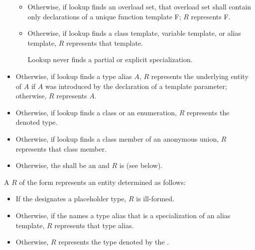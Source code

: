 \begin{itemize}
\begin{itemize}
\item
Otherwise, if lookup finds an overload set,
that overload set shall contain only
declarations of a unique function template F;
$R$ represents F.
\item
Otherwise, if lookup finds
a class template, variable template, or alias template,
$R$ represents that template.
\begin{note}
Lookup never finds a partial or explicit specialization.
\end{note}
\end{itemize}
\item
Otherwise, if lookup finds a type alias $A$,
$R$ represents the underlying entity of $A$
if $A$ was introduced by the declaration of a template parameter;
otherwise, $R$ represents $A$.
\item
Otherwise, if lookup finds a class or an enumeration,
$R$ represents the denoted type.
\item
Otherwise, if lookup finds a class member of an anonymous union, $R$ represents that class member.
\item
Otherwise,
the  shall be an  
and $R$ is  (see below).
\end{itemize}

\pnum
A  $R$ of the form
represents an entity determined as follows:
\begin{itemize}
\item
If the  designates
a placeholder type,
$R$ is ill-formed.
\item
Otherwise, if the  names a type alias
that is a specialization of an alias template,
$R$ represents that type alias.
\item
Otherwise, $R$ represents the type denoted by the .
\end{itemize}

